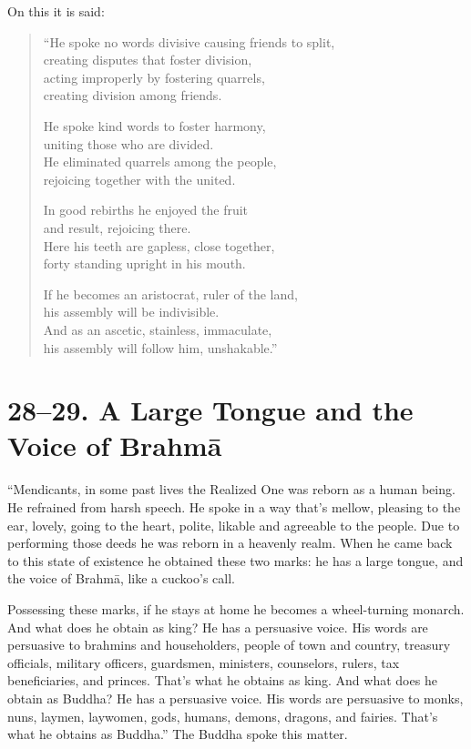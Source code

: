 \documentclass[12pt,openany]{book}%
\begin{document}
On this it is said: 

\begin{verse}%
“He spoke no words divisive causing friends to split, \\
creating disputes that foster division, \\
acting improperly by fostering quarrels, \\
creating division among friends. 

He spoke kind words to foster harmony, \\
uniting those who are divided. \\
He eliminated quarrels among the people, \\
rejoicing together with the united. 

In good rebirths he enjoyed the fruit \\
and result, rejoicing there. \\
Here his teeth are gapless, close together, \\
forty standing upright in his mouth. 

If he becomes an aristocrat, ruler of the land, \\
his assembly will be indivisible. \\
And as an ascetic, stainless, immaculate, \\
his assembly will follow him, unshakable.” 

%
\end{verse}

\section*{28–29. A Large Tongue and the Voice of \textsanskrit{Brahmā} }

“Mendicants, in some past lives the Realized One was reborn as a human being. He refrained from harsh speech. He spoke in a way that’s mellow, pleasing to the ear, lovely, going to the heart, polite, likable and agreeable to the people. Due to performing those deeds he was reborn in a heavenly realm. When he came back to this state of existence he obtained these two marks: he has a large tongue, and the voice of \textsanskrit{Brahmā}, like a cuckoo’s call. 

Possessing these marks, if he stays at home he becomes a wheel-turning monarch. And what does he obtain as king? He has a persuasive voice. His words are persuasive to brahmins and householders, people of town and country, treasury officials, military officers, guardsmen, ministers, counselors, rulers, tax beneficiaries, and princes. That’s what he obtains as king. And what does he obtain as Buddha? He has a persuasive voice. His words are persuasive to monks, nuns, laymen, laywomen, gods, humans, demons, dragons, and fairies. That’s what he obtains as Buddha.” The Buddha spoke this matter. 
\end{document}
